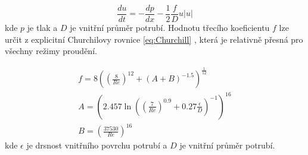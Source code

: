 \begin{equation}
  \label{eq:momentum}
  \frac{du}{dt} = -\frac{dp}{dx} - \frac{1}{2}\frac{f}{D}u|u|
\end{equation}
kde \(p\) je tlak a \(D\) je vnitřní průměr potrubí. Hodnotu třecího
koeficientu \(f\) lze určit z explicitní Churchilovy rovnice \ref{eq:Churchill}
\cite{Churchill1977}, která je relativně přesná pro všechny režimy proudění.

\begin{equation}
  \label{eq:Churchill}
  \begin{gathered}
    f=8\left(\left(\frac{8}{Re}\right)^{12}+(A+B)^{-1.5}\right)^\frac{1}{12} \\
    A=\left(2.457\ln\left(\left(\frac{7}{Re}\right)^{0.9}
      +0.27\frac{\epsilon}{D}\right)^{-1}\right)^{16} \\
    B=\left(\frac{37530}{Re}\right)^{16}
  \end{gathered}
\end{equation}
kde \(\epsilon\) je drsnost vnitřního povrchu potrubí a \(D\) je vnitřní průměr
potrubí.


